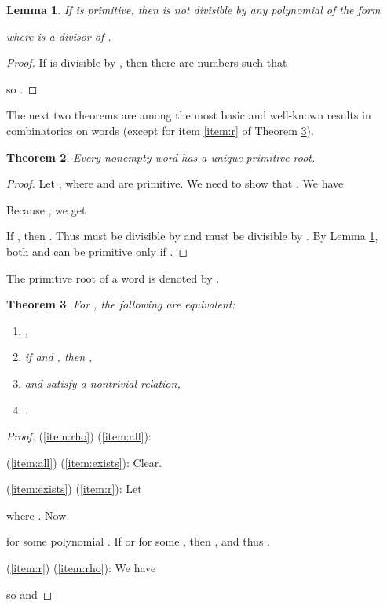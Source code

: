 \documentclass[submission]{eptcs}
\newtheorem{theorem}{Theorem}[section]
\newtheorem{lemma}[theorem]{Lemma}
\theoremstyle{definition}
\begin{document}
\begin{lemma} \label{lem:primdiv}
If  is primitive, then  is not divisible by any
polynomial of the form

where  is a divisor of .
\end{lemma}
\begin{proof}
If  is divisible by , then there
are numbers  such that

so .
\end{proof}

The next two theorems are among the most basic and well-known
results in combinatorics on words (except for item \eqref{item:r} of
Theorem \ref{thm:commutation}).

\begin{theorem}
Every nonempty word has a unique primitive root.
\end{theorem}
\begin{proof}
Let , where  and  are primitive. We need to show
that . We have

Because , we get

If , then .
Thus  must be divisible by  and
 must be divisible by . By Lemma
\ref{lem:primdiv}, both  and  can be primitive only if .
\end{proof}

The primitive root of a word  is denoted by
.

\begin{theorem} \label{thm:commutation}
For , the following are equivalent:
\begin{enumerate}
\item , \label{item:rho}
\item if  and , then , \label{item:all}
\item  and  satisfy a nontrivial relation, \label{item:exists}
\item . \label{item:r}
\end{enumerate}
\end{theorem}
\begin{proof}
(\ref{item:rho})  (\ref{item:all}):


(\ref{item:all})  (\ref{item:exists}): Clear.

(\ref{item:exists})  (\ref{item:r}): Let

where . Now

for some polynomial . If  or  for some ,
then , and thus .

(\ref{item:r})  (\ref{item:rho}): We have

so  and

\end{proof}
\end{document}
